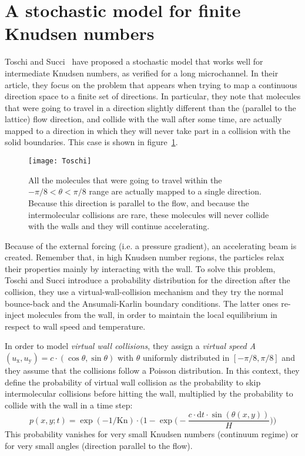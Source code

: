 \section{A stochastic model for finite Knudsen numbers}
Toschi and Succi~\cite{Toschi2005} have proposed a stochastic model that
works well for intermediate Knudsen numbers, as verified for a long microchannel. 
In their article, they focus on the problem
that appears when trying to map a continuous direction space to a finite set of
directions. In particular, they note that molecules that were going to travel in
a direction slightly different than the (parallel to the lattice) flow direction,
and collide with the wall after some time, are actually mapped to a direction
in which they will never take part in a collision with the solid boundaries.
This case is shown in figure~\ref{fig:Toschi}. 

\begin{figure}[h!]%
 	\begin{center}%
 		\texttt{[image: Toschi]}%
 		\caption{All the molecules that were going to travel within the %
 		$-\pi/8 < \theta < \pi/8$ range are actually mapped to %
 		a single direction. Because this direction is parallel to the flow, %
 		and because the intermolecular collisions are rare, these molecules %
 		will never collide with the walls and they will continue accelerating.~\cite{Toschi2005}}%
 		\label{fig:Toschi}%
 	\end{center}%
\end{figure}

Because of the external forcing (i.e. a pressure gradient), an accelerating beam
is created. Remember that, in high Knudsen number regions, the particles relax their
properties mainly by interacting with the wall. 
To solve this problem, Toschi and Succi introduce a probability distribution
for the direction after the collision, they use a virtual-wall-collision mechanism and they
try the normal bounce-back and the Ansumali-Karlin boundary conditions.
The latter ones re-inject molecules from the wall, in order to maintain the
local equilibrium in respect to wall speed and temperature.

In order to model \textit{virtual wall collisions}, they assign a \textit{virtual speed A}
$(u_\mathrm{x}, u_\mathrm{y}) = c \cdot (\cos \theta, \sin \theta)$ with $\theta$
uniformly distributed in $[-\pi/8 , \pi/8]$ and they assume that the collisions
follow a Poisson distribution. In this context, they define the probability
of virtual wall collision as the probability to skip intermolecular collisions before hitting
the wall, multiplied by the probability to collide with the wall in a time step:
\begin{equation}
 p(x, y; t) = \exp( -1/\mathrm{Kn} ) \cdot \Big( 1 - \exp \Big( - \frac{c \cdot \mathrm{d}t \cdot \sin(\theta(x,y))}{H} \Big)   \Big)
\end{equation}
This probability vanishes for very small Knudsen numbers (continuum regime)
or for very small angles (direction parallel to the flow).

